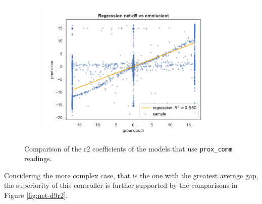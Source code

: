 \begin{figure}[!htb]
\begin{center}
	\end{center}
	\hfil\vspace{-0.8cm}
	\begin{center}
		\begin{subfigure}[h]{0.49\textwidth}
			\includegraphics[width=\textwidth]{contents/images/net-d9/regression-net-d9-vs-omniscient}
		\end{subfigure}
	\end{center}
	\caption[Comparison of the \gls{r2} coefficients for \texttt{prox\_comm} 
	readings.]{Comparison of the \gls{r2} coefficients of the models that use 
		\texttt{prox\_comm} readings.}
	\label{fig:net-d789r2}
\end{figure}

Considering the more complex case, that is the one with the greatest average gap,
the superiority of this controller is further supported by the comparisons in Figure
\ref{fig:net-d9r2}. 

